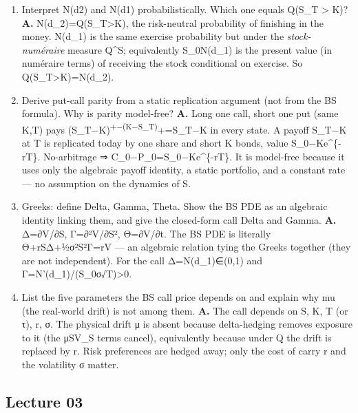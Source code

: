 \documentclass[
  11pt,
]{article}
\begin{document}
\begin{enumerate}
  Z\textasciitilde N((r−½σ²)T,σ²T). The K-term is
  Ke\textsuperscript{\{-rT\}·Q(S\_T\textgreater K)=Ke}\{-rT\}N(d\_2).
  For the S\_0 e\^{}z-term, completing the square in z−(z−m)²/2v² gives
  S\_0 e\^{}z f\_Z(z)=S\_0 e\^{}\{rT\}·(N(m+v²,v²) density), i.e.~a
  Girsanov shift of the mean up by v²=σ²T (change to the stock
  numéraire). That shift turns d\_2 into d\_1=d\_2+σ√T, giving
  C\_0=S\_0N(d\_1)−Ke\^{}\{-rT\}N(d\_2).
\item
  Interpret N(d2) and N(d1) probabilistically. Which one equals Q(S\_T
  \textgreater{} K)? \textbf{A.} N(d\_2)=Q(S\_T\textgreater K), the
  risk-neutral probability of finishing in the money. N(d\_1) is the
  same exercise probability but under the \emph{stock-numéraire} measure
  Q\^{}S; equivalently S\_0N(d\_1) is the present value (in numéraire
  terms) of receiving the stock conditional on exercise. So
  Q(S\_T\textgreater K)=N(d\_2).
\item
  Derive put-call parity from a static replication argument (not from
  the BS formula). Why is parity model-free? \textbf{A.} Long one call,
  short one put (same K,T) pays
  (S\_T−K)\textsuperscript{+−(K−S\_T)}+=S\_T−K in every state. A payoff
  S\_T−K at T is replicated today by one share and short K bonds, value
  S\_0−Ke\^{}\{-rT\}. No-arbitrage ⇒ C\_0−P\_0=S\_0−Ke\^{}\{-rT\}. It is
  model-free because it uses only the algebraic payoff identity, a
  static portfolio, and a constant rate --- no assumption on the
  dynamics of S.
\item
  Greeks: define Delta, Gamma, Theta. Show the BS PDE as an algebraic
  identity linking them, and give the closed-form call Delta and Gamma.
  \textbf{A.} Δ=∂V/∂S, Γ=∂²V/∂S², Θ=∂V/∂t. The BS PDE is literally
  Θ+rSΔ+½σ²S²Γ=rV --- an algebraic relation tying the Greeks together
  (they are not independent). For the call Δ=N(d\_1)∈(0,1) and
  Γ=N'(d\_1)/(S\_0σ√T)\textgreater0.
\item
  List the five parameters the BS call price depends on and explain why
  mu (the real-world drift) is not among them. \textbf{A.} The call
  depends on S, K, T (or τ), r, σ. The physical drift μ is absent
  because delta-hedging removes exposure to it (the μSV\_S terms
  cancel), equivalently because under Q the drift is replaced by r. Risk
  preferences are hedged away; only the cost of carry r and the
  volatility σ matter.
\end{enumerate}

\hypertarget{lecture-03}{%
\subsection{Lecture 03}\label{lecture-03}}
\end{document}
